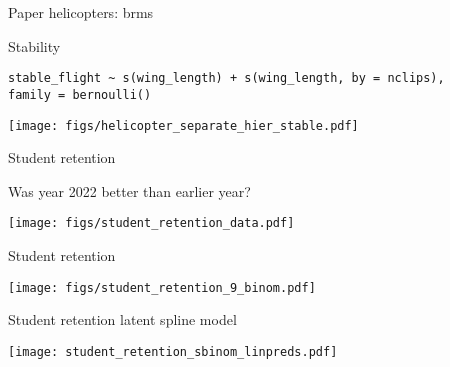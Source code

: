 \documentclass[finnish,english,t]{beamer}
\begin{document}
\begin{frame}[fragile]{Paper helicopters: brms}

Stability
  
{\small
\begin{verbatim}
stable_flight ~ s(wing_length) + s(wing_length, by = nclips),
family = bernoulli()
\end{verbatim}
}

  \texttt{[image: figs/helicopter\_separate\_hier\_stable.pdf]}

\end{frame}

\begin{frame}{Student retention}

  Was year 2022 better than earlier year?
  
  \texttt{[image: figs/student\_retention\_data.pdf]}
  
\end{frame}

\begin{frame}{Student retention }

  \vspace{-0.75\baselineskip}
  \texttt{[image: figs/student\_retention\_9\_binom.pdf]}

\end{frame}

\begin{frame}[fragile]{Student retention latent spline model}

  \vspace{-0.5\baselineskip}
  \hspace{-5mm}\texttt{[image: student\_retention\_sbinom\_linpreds.pdf]}
  \begin{minipage}[t][6cm][t]{1.0\linewidth}
  \end{minipage}
\end{frame}
\end{document}

